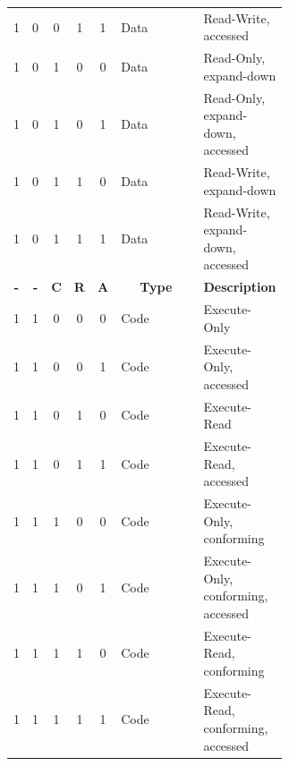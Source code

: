 \documentclass{article}
\begin{document}
{\begin{table}[H]
\begin{tabular}{|c|c|c|c|c|p{0.303\linewidth}|p{0.303\linewidth}|}
      1 & 0 & 0 & 1 & 1 & Data & Read-Write, accessed \\
      1 & 0 & 1 & 0 & 0 & Data & Read-Only, expand-down \\
      1 & 0 & 1 & 0 & 1 & Data & Read-Only, expand-down, accessed \\
      1 & 0 & 1 & 1 & 0 & Data & Read-Write, expand-down \\
      1 & 0 & 1 & 1 & 1 & Data & Read-Write, expand-down, accessed \\ \hline
      \textbf{-} & \textbf{-} & \textbf{C} & \textbf{R} & \textbf{A} & \multicolumn{1}{c|}{\textbf{Type}} & \multicolumn{1}{c|}{\textbf{Description}} \\ \hline
      1 & 1 & 0 & 0 & 0 & Code & Execute-Only \\
      1 & 1 & 0 & 0 & 1 & Code & Execute-Only, accessed \\
      1 & 1 & 0 & 1 & 0 & Code & Execute-Read \\
      1 & 1 & 0 & 1 & 1 & Code & Execute-Read, accessed \\
      1 & 1 & 1 & 0 & 0 & Code & Execute-Only, conforming \\
      1 & 1 & 1 & 0 & 1 & Code & Execute-Only, conforming, accessed \\
      1 & 1 & 1 & 1 & 0 & Code & Execute-Read, conforming \\
      1 & 1 & 1 & 1 & 1 & Code & Execute-Read, conforming, accessed \\ \hline
    \end{tabular}
  \end{table}
}
\end{document}
